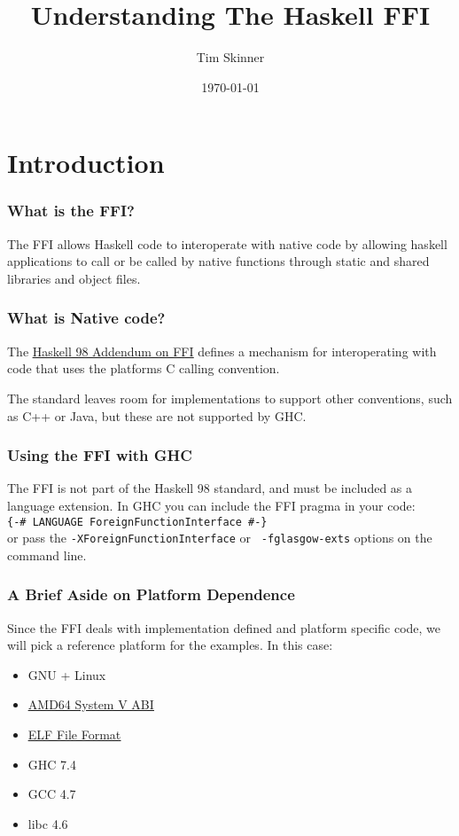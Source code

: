 \documentclass{beamer}
\title{Understanding The Haskell FFI}
\author{Tim Skinner}
\institute{tim@timskinner.net}
\date{\today}
\newcommand{\chref}[3] {
    {\color{#1} \href{#2}{\underline{#3}}}
}
\begin{document}
\begin{frame}
    \titlepage
\end{frame}

\section{Introduction}
\begin{frame}
    \frametitle{What is the FFI?}

    The FFI allows Haskell code to interoperate with native code by allowing
    haskell applications to call or be called by native functions through
    static and shared libraries and object files.

\end{frame}

\begin{frame}
    \frametitle{What is Native code?}

    The \chref{darkgray}
    {http://www.cse.unsw.edu.au/~chak/haskell/ffi/ffi/ffi.html} {Haskell 98
    Addendum on FFI} defines a mechanism for interoperating with code that uses
    the platforms C calling convention.

    The standard leaves room for implementations to support other conventions,
    such as C++ or Java, but these are not supported by GHC.
\end{frame}

\begin{frame}
    \frametitle{Using the FFI with GHC}

    The FFI is not part of the Haskell 98 standard, and must be included as a
    language extension.  In GHC you can include the FFI pragma in your code: \\
    \vspace{2mm} {\tt \{-\# LANGUAGE ForeignFunctionInterface \#-\}} \\
    \vspace{2mm} or pass the {\tt -XForeignFunctionInterface} or {\tt
    -fglasgow-exts} options on the command line.
\end{frame}

\begin{frame}
    \frametitle{A Brief Aside on Platform Dependence}

    Since the FFI deals with implementation defined and platform specific code,
    we will pick a reference platform for the examples.  In this case:

    \begin{itemize}
        \item {GNU + Linux}
        \item {\chref{darkgray}{http://www.uclibc.org/docs/psABI-x86_64.pdf}{AMD64 System V ABI}}
        \item {\chref{darkgray}{http://www.skyfree.org/linux/references/ELF_Format.pdf}{ELF File Format}}
        \item {GHC 7.4}
        \item {GCC 4.7}
        \item {libc 4.6}
    \end{itemize}
\end{frame}
\end{document}
